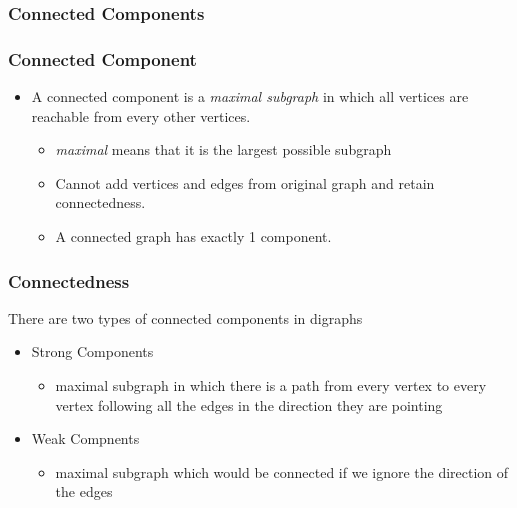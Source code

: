 \documentclass[newPxFont,sthlmFooter,nooffset]{beamer}
\begin{document}
\begin{frame}[t]
  \frametitle{Connected Components}

\begin{center}
\end{center}
\end{frame}


\begin{frame}[t]
  \frametitle{Connected Component}
  \begin{itemize}
  \item A connected component is a \textit{maximal subgraph} in which all vertices are reachable from every other vertices.
    \begin{itemize}
    \item \textit{maximal} means that it is the largest possible subgraph
    \item Cannot add vertices and edges from original graph and retain
      connectedness.
  \item A connected graph has exactly 1 component. 
    \end{itemize}
  \end{itemize}
\begin{center}
\end{center}
\end{frame}

\begin{frame}[t]
  \frametitle{Connectedness}
There are two types of connected components in digraphs
\begin{itemize}
\item Strong Components
  \begin{itemize}
  \item maximal subgraph in which there is a path from every vertex to every vertex following all the edges in the direction they are pointing
  \end{itemize}
\item Weak Compnents
  \begin{itemize}
  \item maximal subgraph which would be connected if we ignore the direction of the edges
  \end{itemize}
\end{itemize}

\end{frame}
\end{document}
